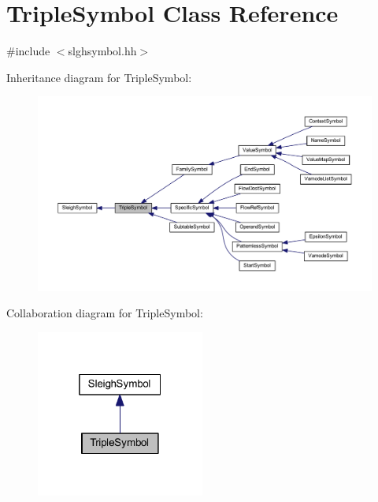 \hypertarget{class_triple_symbol}{}\section{Triple\+Symbol Class Reference}
\label{class_triple_symbol}


{\ttfamily \#include $<$slghsymbol.\+hh$>$}



Inheritance diagram for Triple\+Symbol\+:
\nopagebreak
\begin{figure}[H]
\begin{center}
\leavevmode
\includegraphics[width=350pt]{class_triple_symbol__inherit__graph}
\end{center}
\end{figure}


Collaboration diagram for Triple\+Symbol\+:
\nopagebreak
\begin{figure}[H]
\begin{center}
\leavevmode
\includegraphics[width=157pt]{class_triple_symbol__coll__graph}
\end{center}
\end{figure}
